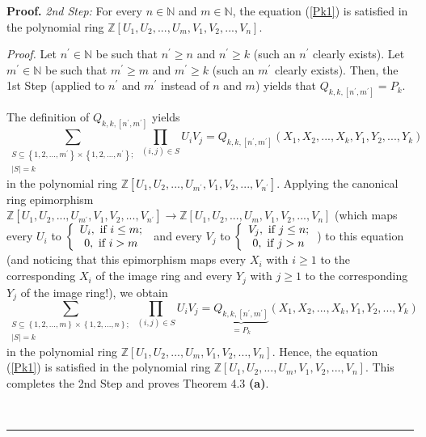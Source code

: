 \documentclass[numbers=enddot,12pt,final,onecolumn,notitlepage]{scrartcl}%
\newenvironment{proof}[1][Proof]{\noindent\textbf{#1.} }{\ \rule{0.5em}{0.5em}}
\begin{document}
\begin{proof}
\textit{2nd Step:} For every $n\in\mathbb{N}$ and $m\in\mathbb{N}$, the
equation (\ref{Pk1}) is satisfied in the polynomial ring $\mathbb{Z}\left[
U_{1},U_{2},...,U_{m},V_{1},V_{2},...,V_{n}\right]  $.

\textit{Proof.} Let $n^{\prime}\in\mathbb{N}$ be such that $n^{\prime}\geq n$
and $n^{\prime}\geq k$ (such an $n^{\prime}$ clearly exists). Let $m^{\prime
}\in\mathbb{N}$ be such that $m^{\prime}\geq m$ and $m^{\prime}\geq k$ (such
an $m^{\prime}$ clearly exists). Then, the 1st Step (applied to $n^{\prime}$
and $m^{\prime}$ instead of $n$ and $m$) yields that $Q_{k,k,\left[
n^{\prime},m^{\prime}\right]  }=P_{k}.$

The definition of $Q_{k,k,\left[  n^{\prime},m^{\prime}\right]  }$ yields
\[
\sum_{\substack{S\subseteq\left\{  1,2,...,m^{\prime}\right\}  \times\left\{
1,2,...,n^{\prime}\right\}  ;\\\left\vert S\right\vert =k}}\prod_{\left(
i,j\right)  \in S}U_{i}V_{j}=Q_{k,k,\left[  n^{\prime},m^{\prime}\right]
}\left(  X_{1},X_{2},...,X_{k},Y_{1},Y_{2},...,Y_{k}\right)
\]
in the polynomial ring $\mathbb{Z}\left[  U_{1},U_{2},...,U_{m^{\prime}}%
,V_{1},V_{2},...,V_{n^{\prime}}\right]  $. Applying the canonical ring
epimorphism $\mathbb{Z}\left[  U_{1},U_{2},...,U_{m^{\prime}},V_{1}%
,V_{2},...,V_{n^{\prime}}\right]  \rightarrow\mathbb{Z}\left[  U_{1}%
,U_{2},...,U_{m},V_{1},V_{2},...,V_{n}\right]  $ (which maps every $U_{i}$ to
$\left\{
\begin{array}
[c]{c}%
U_{i},\text{ if }i\leq m;\\
0,\text{ if }i>m
\end{array}
\right.  $ and every $V_{j}$ to $\left\{
\begin{array}
[c]{c}%
V_{j},\text{ if }j\leq n;\\
0,\text{ if }j>n
\end{array}
\right.  $) to this equation (and noticing that this epimorphism maps every
$X_{i}$ with $i\geq1$ to the corresponding $X_{i}$ of the image ring and every
$Y_{j}$ with $j\geq1$ to the corresponding $Y_{j}$ of the image ring!), we
obtain%
\[
\sum_{\substack{S\subseteq\left\{  1,2,...,m\right\}  \times\left\{
1,2,...,n\right\}  ;\\\left\vert S\right\vert =k}}\prod_{\left(  i,j\right)
\in S}U_{i}V_{j}=\underbrace{Q_{k,k,\left[  n^{\prime},m^{\prime}\right]  }%
}_{=P_{k}}\left(  X_{1},X_{2},...,X_{k},Y_{1},Y_{2},...,Y_{k}\right)
\]
in the polynomial ring $\mathbb{Z}\left[  U_{1},U_{2},...,U_{m},V_{1}%
,V_{2},...,V_{n}\right]  $. Hence, the equation (\ref{Pk1}) is satisfied in
the polynomial ring $\mathbb{Z}\left[  U_{1},U_{2},...,U_{m},V_{1}%
,V_{2},...,V_{n}\right]  .$ This completes the 2nd Step and proves Theorem 4.3
\textbf{(a)}.


\end{proof}
\end{document}
